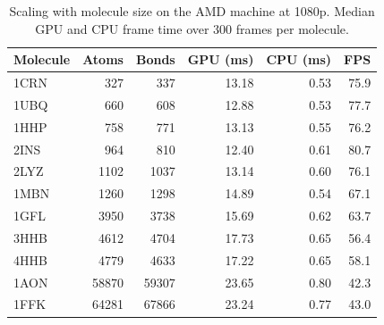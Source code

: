 \begin{table}[H]
    \centering
    \small
    \begin{tabular}{lrrrrr}
        \toprule
        Molecule & Atoms & Bonds & GPU (ms) & CPU (ms) & FPS \\
        \midrule
        1CRN & 327 & 337 & 13.18 & 0.53 & 75.9 \\
        1UBQ & 660 & 608 & 12.88 & 0.53 & 77.7 \\
        1HHP & 758 & 771 & 13.13 & 0.55 & 76.2 \\
        2INS & 964 & 810 & 12.40 & 0.61 & 80.7 \\
        2LYZ & 1102 & 1037 & 13.14 & 0.60 & 76.1 \\
        1MBN & 1260 & 1298 & 14.89 & 0.54 & 67.1 \\
        1GFL & 3950 & 3738 & 15.69 & 0.62 & 63.7 \\
        3HHB & 4612 & 4704 & 17.73 & 0.65 & 56.4 \\
        4HHB & 4779 & 4633 & 17.22 & 0.65 & 58.1 \\
        1AON & 58870 & 59307 & 23.65 & 0.80 & 42.3 \\
        1FFK & 64281 & 67866 & 23.24 & 0.77 & 43.0 \\
        \bottomrule
    \end{tabular}
    \caption{Scaling with molecule size on the AMD machine at 1080p. Median GPU and CPU frame time over 300 frames per molecule.}
    \label{tab:scaling_amd}
\end{table}
